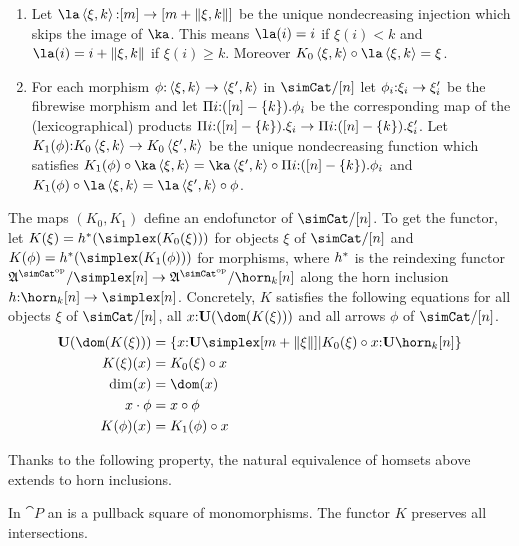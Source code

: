 \documentclass[csh.tex]{subfiles}
\begin{document}
\begin{definition}
\begin{enumerate}
\item Let $\la\tuplet{\xi,k}\of[m]\to[m+\norm{\xi,k}]$ be the unique nondecreasing injection which skips the image of $\ka$. This means $\la(i)=i$ if $\xi(i)<k$ and $\la(i)=i+\norm{\xi,k}$ if $\xi(i)\geq k$. Moreover $K_0\tuplet{\xi,k}\circ\la\tuplet{\xi,k} = \xi$.

\item For each morphism $\phi\mathord :\left\langle \xi,k \right\rangle\to\left\langle \xi',k \right\rangle$ in $\simCat/[n]$ let $\phi_i\mathord :\xi_i\to\xi'_i$ be the fibrewise morphism and let $\Pi i\mathord :([n]-\left\{k\right\}) .{\phi_i}$ be the corresponding map of the (lexicographical) products $\Pi i\mathord :([n]-\left\{k\right\}) .{\xi_i}\to\Pi i\mathord :([n]-\left\{k\right\}) .{\xi'_i}$. Let $K_1(\phi)\mathord : K_0\left\langle \xi,k \right\rangle\to K_0\left\langle \xi',k \right\rangle$ be the unique nondecreasing function which satisfies $K_1(\phi)\circ \ka\tuplet{\xi,k} = \ka\tuplet{\xi',k}\circ \product{i\of([n]-\set k)}{\phi_i}$ and $K_1(\phi)\circ \la\tuplet{\xi,k} = \la\tuplet{\xi',k}\circ \phi$.
\end{enumerate}

The maps $(K_0,K_1)$ define an endofunctor of $\simCat/[n]$. To get the functor, let $K(\xi) = h\ri(\simplex(K_0(\xi)))$ for objects $\xi$ of $\simCat/[n]$ and $K(\phi) = h\ri(\simplex(K_1(\phi)))$ for morphisms, where $h^*$ is the reindexing functor $\ambient\s/\simplex[n]\to\ambient\s/\horn_k[n]$ along the horn inclusion $h\of \horn_k[n]\to\simplex[n]$. Concretely, $K$ satisfies the following equations for all objects $\xi$ of $\simCat/[n]$, all $x\of \base(\dom(K(\xi)))$ and all arrows $\phi$ of $\simCat/[n]$.
\begin{align*}
\base(\dom(K(\xi))) &= \set{ x\of\base\simplex[m+\norm\xi]| K_0(\xi)\circ x\of\base\horn_k[n]}\\
K(\xi)(x) &= K_0(\xi)\circ x \\
\dim(x) &= \dom(x) \\
x\cdot\phi &= x\circ\phi \\
K(\phi)(x) &= K_1(\phi)\circ x
\end{align*}
\end{definition}

Thanks to the following property, the natural equivalence of homsets above extends to horn inclusions.

\begin{lemma} In $\cat P$ an  is a pullback square of monomorphisms. The functor $K$ preserves all intersections. \end{lemma}

\end{document}
